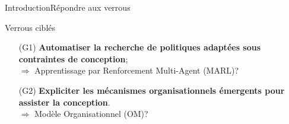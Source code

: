 \begin{frame}{Introduction}{Répondre aux verrous}

    \begin{exampleblock}{Verrous ciblés}
        \begin{enumerate}
            \item[\phantom{X} (G1)] \textbf{Automatiser la recherche de politiques adaptées sous contraintes de conception};
                \\ $\Longrightarrow$ Apprentissage par Renforcement Multi-Agent (MARL)?
            \item[\phantom{X} (G2)] \textbf{Expliciter les mécanismes organisationnels émergents pour assister la conception}.
                \\ $\Longrightarrow$ Modèle Organisationnel (OM)?
        \end{enumerate}
    \end{exampleblock}


    \begin{table}[]


\end{table}
\end{frame}
